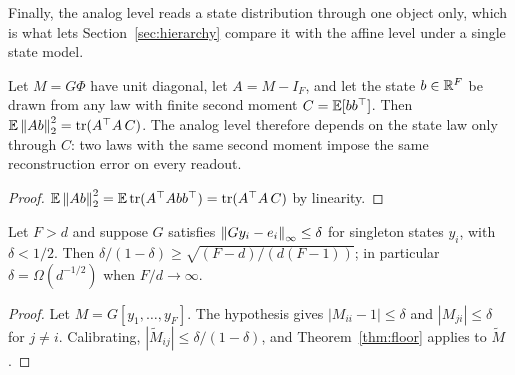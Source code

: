 Finally, the analog level reads a state distribution through one object only, which is what lets
Section~\ref{sec:hierarchy} compare it with the affine level under a single state model.

\begin{proposition}
\label{prop:secondmoment}
Let $M=G\Phi$ have unit diagonal, let $A=M-I_F$, and let the state $b\in\mathbb{R}^F$ be drawn from any
law with finite second moment $C=\mathbb{E}[bb^{\top}]$. Then
$\mathbb{E}\left\lVert Ab \right\rVert_2^2=\operatorname{tr}(A^{\top}A\,C)$. The analog level therefore depends on the
state law only through $C$: two laws with the same second moment impose the same reconstruction
error on every readout.
\end{proposition}

\begin{proof}
$\mathbb{E}\left\lVert Ab \right\rVert_2^2=\mathbb{E}\operatorname{tr}(A^{\top}Abb^{\top})=\operatorname{tr}(A^{\top}A\,C)$ by
linearity.
\end{proof}

\begin{corollary}
\label{cor:impossible}
Let $F>d$ and suppose $G$ satisfies $\left\lVert G y_i-e_i \right\rVert_\infty\le\delta$ for singleton states
$y_i$, with $\delta<1/2$. Then $\delta/(1-\delta)\ge\sqrt{(F-d)/(d(F-1))}$; in particular
$\delta=\Omega(d^{-1/2})$ when $F/d\to\infty$.
\end{corollary}

\begin{proof}
Let $M=G[y_1,\dots,y_F]$. The hypothesis gives $|M_{ii}-1|\le\delta$ and $|M_{ji}|\le\delta$
for $j\neq i$. Calibrating, $|\widetilde M_{ij}|\le\delta/(1-\delta)$, and
Theorem~\ref{thm:floor} applies to $\widetilde M$.
\end{proof}

